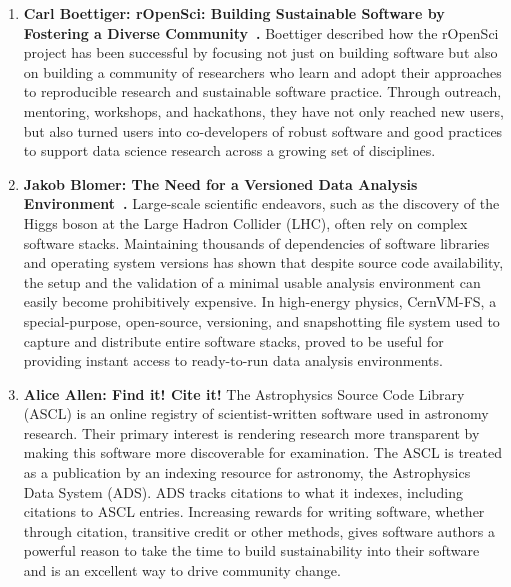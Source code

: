 \documentclass[11pt, oneside]{amsart}
\newcommand{\todo}[1]{{\color{blue}$\blacksquare$~\textsf{[TODO: #1]}}}
\begin{document}
\begin{enumerate}
\item \textbf{Carl Boettiger: rOpenSci: Building Sustainable Software by
Fostering a Diverse Community~\cite{Boettiger_poster}.} Boettiger described how
the rOpenSci project has been successful by focusing not just on building
software but also on building a community of researchers who learn and adopt
their approaches to reproducible research and sustainable software practice.
Through outreach, mentoring, workshops, and hackathons, they have not only
reached new users, but also turned users into co-developers of robust software
and good practices to support data science research across a growing set of
disciplines.

\item \textbf{Jakob Blomer: The Need for a Versioned Data Analysis
Environment~\cite{Blomer_poster}.} Large-scale scientific endeavors, such as the
discovery of the Higgs boson at the Large Hadron Collider (LHC), often rely on
complex software stacks. Maintaining thousands of dependencies of software
libraries and operating system versions has shown that despite source code
availability, the setup and the validation of a minimal usable analysis
environment can easily become prohibitively expensive. In high-energy physics,
CernVM-FS, a special-purpose, open-source, versioning, and snapshotting file
system used to capture and distribute entire software stacks, proved to be
useful for providing instant access to ready-to-run data analysis environments.

\item \textbf{Alice Allen: Find it! Cite it! }%
The Astrophysics Source Code Library (ASCL) is an online registry of
scientist-written software used in astronomy research. Their primary interest is
rendering research more transparent by making this software more discoverable for
examination. The ASCL is treated as a publication by an indexing resource for
astronomy, the Astrophysics Data System (ADS). ADS tracks citations to what it
indexes, including citations to ASCL entries. Increasing rewards for writing
software, whether through citation, transitive credit or other methods, gives
software authors a powerful reason to take the time to build sustainability into
their software and is an excellent way to drive community change.
\end{enumerate}
\end{document}
